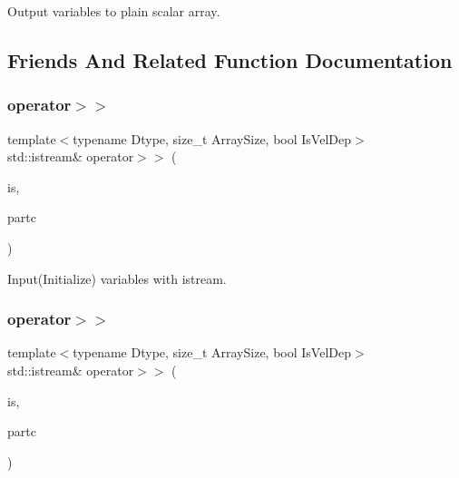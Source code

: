 Output variables to plain scalar array. 



\subsection{Friends And Related Function Documentation}
\mbox{\label{class_space_h_1_1_vel_dep_chain_particles_aa49e7bdbd28850629b79699eadb04d9c}} 
\subsubsection{\texorpdfstring{operator$>$$>$}{operator>>}\hspace{0.1cm}{\footnotesize\ttfamily [1/2]}}
{\footnotesize\ttfamily template$<$typename Dtype, size\+\_\+t Array\+Size, bool Is\+Vel\+Dep$>$ \\
std\+::istream\& operator$>$$>$ (\begin{DoxyParamCaption}\item[{std\+::istream \&}]{is,  }\item[{\mbox{\hyperlink{class_space_h_1_1_vel_dep_chain_particles}{Vel\+Dep\+Chain\+Particles}}$<$ Dtype, Array\+Size, Is\+Vel\+Dep $>$ \&}]{partc }\end{DoxyParamCaption})\hspace{0.3cm}{\ttfamily [friend]}}



Input(\+Initialize) variables with istream. 

\mbox{\label{class_space_h_1_1_vel_dep_chain_particles_aa49e7bdbd28850629b79699eadb04d9c}} 
\subsubsection{\texorpdfstring{operator$>$$>$}{operator>>}\hspace{0.1cm}{\footnotesize\ttfamily [2/2]}}
{\footnotesize\ttfamily template$<$typename Dtype, size\+\_\+t Array\+Size, bool Is\+Vel\+Dep$>$ \\
std\+::istream\& operator$>$$>$ (\begin{DoxyParamCaption}\item[{std\+::istream \&}]{is,  }\item[{\mbox{\hyperlink{class_space_h_1_1_vel_dep_chain_particles}{Vel\+Dep\+Chain\+Particles}}$<$ Dtype, Array\+Size, Is\+Vel\+Dep $>$ \&}]{partc }\end{DoxyParamCaption})\hspace{0.3cm}{\ttfamily [friend]}}



